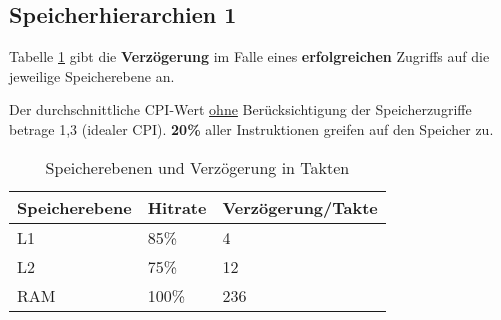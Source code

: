 \subsection{Speicherhierarchien 1}
Tabelle \ref{tbl:hirachy1} gibt die \textbf{Verzögerung} im Falle eines \textbf{erfolgreichen} Zugriffs auf die jeweilige Speicherebene an.

Der durchschnittliche CPI-Wert \underline{ohne} Berücksichtigung der Speicherzugriffe betrage 1,3 (idealer CPI). \textbf{20\%} aller Instruktionen greifen auf den Speicher zu.

\begin{table}[h!]
	\centering
	\begin{tabular}{lll}
		\hline
		Speicherebene & Hitrate & Verzögerung/Takte \\\hline
		L1 & 85\% & 4 \\
		L2 & 75\% & 12 \\
		RAM & 100\% & 236 \\\hline
	\end{tabular}
	\caption{Speicherebenen und Verzögerung in Takten}
	\label{tbl:hirachy1}
\end{table}

